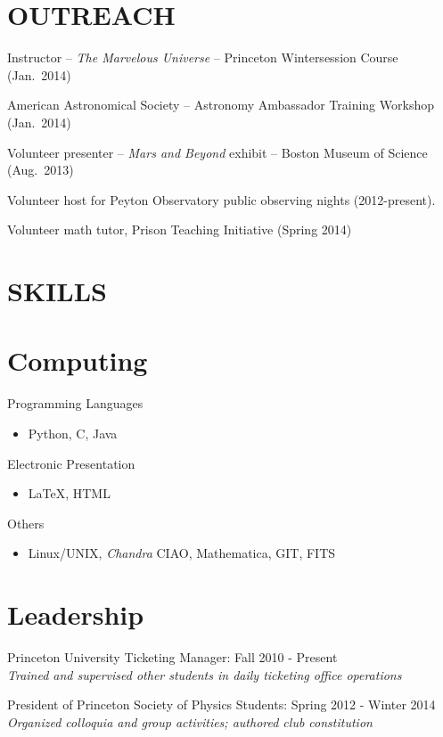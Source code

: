 \documentclass[margin]{res}
\begin{document}
\begin{resume}
\section{OUTREACH}
Instructor -- \textit{The Marvelous Universe} -- Princeton Wintersession Course (Jan.~2014)

American Astronomical Society -- Astronomy Ambassador Training Workshop (Jan.~2014)

Volunteer presenter -- \textit{Mars and
  Beyond} exhibit -- Boston Museum of Science (Aug.~2013)

Volunteer host for Peyton Observatory public
observing nights (2012-present).

Volunteer math tutor, Prison Teaching
Initiative (Spring 2014)

\section{SKILLS}
\normalsize{\section{Computing}}
Programming Languages
\begin{itemize}
\item[] Python, C, Java
\end{itemize}
Electronic Presentation
\begin{itemize}
\item[] \LaTeX, HTML
\end{itemize}
Others
\begin{itemize}
\item[] Linux/UNIX, \textit{Chandra} CIAO, Mathematica, GIT, FITS
\end{itemize}

\normalsize{\section{Leadership}}
Princeton University Ticketing Manager: Fall 2010 - Present\\
\textit{Trained and supervised other students in daily ticketing office operations}

President of Princeton Society of Physics
Students: Spring 2012 - Winter 2014 \\
\textit{Organized colloquia and group activities; authored club constitution}

\end{resume} 
\end{document}
